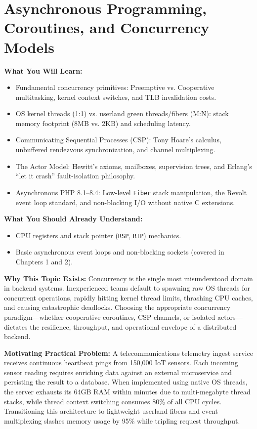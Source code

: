 \chapter{Asynchronous Programming, Coroutines, and Concurrency Models}
\label{chap:async-concurrency}

\begin{chaptergoalsbox}
\textbf{What You Will Learn:}
\begin{itemize}[leftmargin=12pt,itemsep=2pt]
  \item Fundamental concurrency primitives: Preemptive vs. Cooperative multitasking, kernel context switches, and TLB invalidation costs.
  \item OS kernel threads (1:1) vs. userland green threads/fibers (M:N): stack memory footprint (8MB vs. 2KB) and scheduling latency.
  \item Communicating Sequential Processes (CSP): Tony Hoare's calculus, unbuffered rendezvous synchronization, and channel multiplexing.
  \item The Actor Model: Hewitt's axioms, mailboxes, supervision trees, and Erlang's ``let it crash'' fault-isolation philosophy.
  \item Asynchronous PHP 8.1--8.4: Low-level \texttt{Fiber} stack manipulation, the Revolt event loop standard, and non-blocking I/O without native C extensions.
\end{itemize}

\textbf{What You Should Already Understand:}
\begin{itemize}[leftmargin=12pt,itemsep=2pt]
  \item CPU registers and stack pointer (\texttt{RSP}, \texttt{RIP}) mechanics.
  \item Basic asynchronous event loops and non-blocking sockets (covered in Chapters 1 and 2).
\end{itemize}

\textbf{Why This Topic Exists:}
Concurrency is the single most misunderstood domain in backend systems. Inexperienced teams default to spawning raw OS threads for concurrent operations, rapidly hitting kernel thread limits, thrashing CPU caches, and causing catastrophic deadlocks. Choosing the appropriate concurrency paradigm—whether cooperative coroutines, CSP channels, or isolated actors—dictates the resilience, throughput, and operational envelope of a distributed backend.

\textbf{Motivating Practical Problem:}
A telecommunications telemetry ingest service receives continuous heartbeat pings from 150,000 IoT sensors. Each incoming sensor reading requires enriching data against an external microservice and persisting the result to a database. When implemented using native OS threads, the server exhausts its 64GB RAM within minutes due to multi-megabyte thread stacks, while thread context switching consumes 80\% of all CPU cycles. Transitioning this architecture to lightweight userland fibers and event multiplexing slashes memory usage by 95\% while tripling request throughput.
\end{chaptergoalsbox}


